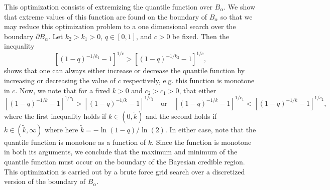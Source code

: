 \documentclass{amsart}
\begin{document}
This optimization consists of extremizing the quantile function 
over $B_\alpha$.  We show that extreme values of this function are found on the 
boundary of $B_\alpha$ so that we may reduce this optimization problem to a one dimensional 
search over the boundary $\partial B_\alpha$.  Let $k_2>k_1>0$, $q\in[0,1]$, and $c>0$ be fixed. 
Then the inequality 
%
\begin{equation}
    \left[(1-q)^{-1/k_1}-1\right]^{1/c} > \left[(1-q)^{-1/k_2}-1\right]^{1/c},
\end{equation}
%
shows that one can always either increase or decrease the quantile function by increasing or 
decreasing the value of $c$ respectively, e.g. this function is monotone in $c$.  Now, we 
note that for a fixed $k>0$ and $c_2>c_1>0$, that either 
%
\begin{equation}
    \left[(1-q)^{-1/k}-1\right]^{1/c_1} > \left[(1-q)^{-1/k}-1\right]^{1/c_2}
    \quad \mathrm{or}\quad 
    \left[(1-q)^{-1/k}-1\right]^{1/c_1} < \left[(1-q)^{-1/k}-1\right]^{1/c_2},
\end{equation}
%
where the first inequality holds if $k\in(0,\tilde{k})$ and the second holds if 
$k\in(\tilde{k},\infty)$ where here $\tilde{k}=-\ln(1-q)/\ln(2)$.  In either case, 
note that the quantile function is monotone as a function of $k$.  Since the 
function is monotone in both its arguments, we conclude that the maximum and minimum of 
the quantile function must occur on the boundary of the Bayesian credible region.  This optimization 
is carried out by a brute force grid search over a discretized version of 
the boundary of $B_\alpha$. 
\end{document}
